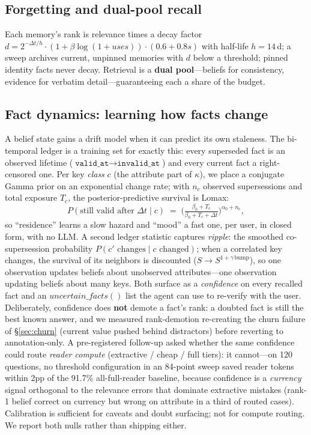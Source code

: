 \documentclass[11pt]{article}
\begin{document}
\subsection{Forgetting and dual-pool recall}
Each memory's rank is relevance times a decay factor
$d = 2^{-\Delta t/h}\cdot(1+\beta\log(1+\textit{uses}))\cdot(0.6+0.8s)$ with half-life
$h=14$\,d; a sweep archives current, unpinned memories with $d$ below a threshold; pinned
identity facts never decay. Retrieval is a \textbf{dual pool}---beliefs for consistency,
evidence for verbatim detail---guaranteeing each a share of the budget.

\subsection{Fact dynamics: learning how facts change}\label{sec:dynamics}
A belief state gains a drift model when it can predict its own staleness. The
bi-temporal ledger is a training set for exactly this: every superseded fact is an
observed lifetime ($\texttt{valid\_at}\!\to\!\texttt{invalid\_at}$) and every current
fact a right-censored one. Per key \emph{class} $c$ (the attribute part of
$\kappa$), we place a conjugate Gamma prior on an exponential change rate; with
$n_c$ observed supersessions and total exposure $T_c$, the posterior-predictive
survival is Lomax:
\begin{equation}
P(\text{still valid after } \Delta t \mid c) \;=\;
\Big(\tfrac{\beta_0 + T_c}{\beta_0 + T_c + \Delta t}\Big)^{\alpha_0 + n_c},
\end{equation}
so ``residence'' learns a slow hazard and ``mood'' a fast one, per user, in closed
form, with no LLM. A second ledger statistic captures \emph{ripple}: the smoothed
co-supersession probability $P(c' \text{ changes} \mid c \text{ changed})$; when a
correlated key changes, the survival of its neighbors is discounted
($S \to S^{1+\gamma\,\text{bump}}$), so one observation updates beliefs about
unobserved attributes---one observation updating beliefs about many keys. Both surface as a
\emph{confidence} on every recalled fact and an $\textit{uncertain\_facts}()$ list
the agent can use to re-verify with the user. Deliberately, confidence does
\textbf{not} demote a fact's rank: a doubted fact is still the best known answer,
and we measured rank-demotion re-creating the churn failure of \S\ref{sec:churn}
(current value pushed behind distractors) before reverting to annotation-only.
A pre-registered follow-up asked whether the same confidence could route \emph{reader
compute} (extractive / cheap / full tiers): it cannot---on 120 questions, no threshold
configuration in an 84-point sweep saved reader tokens within 2pp of the 91.7\%
all-full-reader baseline, because confidence is a \emph{currency} signal orthogonal to
the relevance errors that dominate extractive mistakes (rank-1 belief correct on
currency but wrong on attribute in a third of routed cases). Calibration is sufficient
for caveats and doubt surfacing; not for compute routing. We report both nulls rather
than shipping either.
\end{document}
